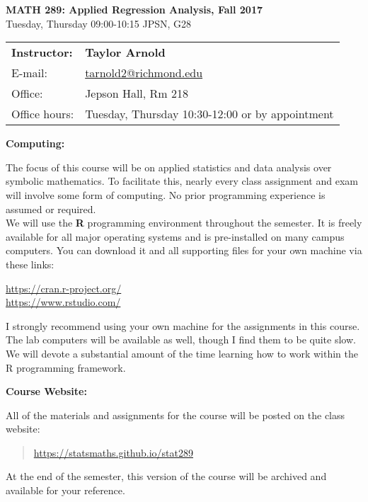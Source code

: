 \documentclass[12pt]{article}
\begin{document}
\begin{center}
{\bf MATH 289: Applied Regression Analysis, Fall 2017} \\
Tuesday, Thursday 09:00-10:15 \quad JPSN, G28\\
\end{center}

\bigskip

\noindent
\begin{tabular}{ l l }
{\bf Instructor:} &  {\bf Taylor Arnold} \\
E-mail: & \href{mailto:tarnold2@richmond.edu}{tarnold2@richmond.edu} \\
Office: & Jepson Hall, Rm 218 \\
Office hours: & Tuesday, Thursday 10:30-12:00 or by appointment
\end{tabular}

\vspace{0.5cm}

\textbf{Computing:} \vspace{6pt}

The focus of this course will be on applied statistics and data
analysis over symbolic mathematics. To facilitate this, nearly
every class assignment and exam will involve some form of
computing. No prior programming experience is assumed or
required. \\

We will use the \textbf{R} programming environment throughout the
semester. It is freely available for all major operating systems and
is pre-installed on many campus computers. You can download it and
all supporting files for your own machine via these links:
\begin{center}
\url{https://cran.r-project.org/} \\
\url{https://www.rstudio.com/}
\end{center}
I strongly recommend using your own machine for the assignments
in this course. The lab computers will be available as well,
though I find them to be quite slow. We will devote a substantial
amount of the time learning how to work within the R programming
framework.

\vspace{0.4cm}

\textbf{Course Website:} \vspace{6pt}

All of the materials and assignments for the course will be posted
on the class website:
\begin{quote}
\url{https://statsmaths.github.io/stat289}
\end{quote}
At the end of the semester, this version of the course
will be archived and available for your reference.
\end{document}
